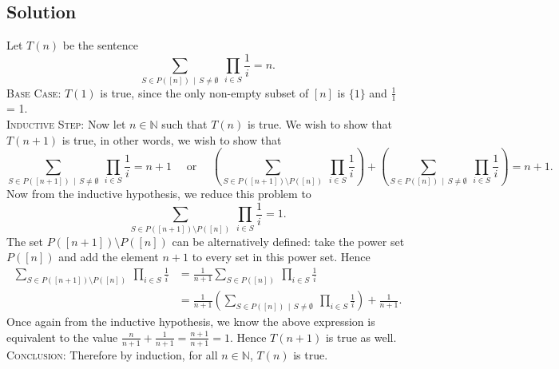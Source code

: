 \documentclass{article}
\begin{document}
\subsection*{Solution}
    Let $T(n)$ be the sentence $$\sum_{S \in P([n]) \, \mid \, S \ne \emptyset} \: \prod_{i \in S} \frac{1}{i} = n.$$ 
    \textsc{Base Case}:  $T(1)$ is true, since the only non-empty subset of $[n]$ is $\{1\}$ and $\frac{1}{1}$ = 1. \\
    \textsc{Inductive Step}: Now let $n \in \mathbb{N}$ such that $T(n)$ is true. We wish to show that $T(n + 1)$ is true, in other words, we wish to show that $$\sum_{S \in P([n + 1]) \, \mid \, S \ne \emptyset} \: \prod_{i \in S} \frac{1}{i} = n + 1 \quad\text{ or }\quad \left(\sum_{S \in P([n + 1]) \setminus P([n])} \: \prod_{i \in S} \frac{1}{i}\right) + \left(\sum_{S \in P([n]) \, \mid \, S \ne \emptyset} \: \prod_{i \in S} \frac{1}{i}\right) = n + 1.$$ Now from the inductive hypothesis, we reduce this problem to $$\sum_{S \in P([n + 1]) \setminus P([n])} \: \prod_{i \in S} \frac{1}{i} = 1.$$ The set $P([n + 1]) \setminus P([n])$ can be alternatively defined: take the power set $P([n])$ and add the element $n + 1$ to every set in this power set. Hence 
    \begin{align*}
        \sum_{S \in P([n + 1]) \setminus P([n])} \: \prod_{i \in S} \frac{1}{i} &= \frac{1}{n + 1}\sum_{S \in P([n])} \: \prod_{i \in S} \frac{1}{i} \\
        &= \frac{1}{n + 1}\left(\sum_{S \in P([n]) \, \mid \, S \ne \emptyset} \: \prod_{i \in S} \frac{1}{i}\right) + \frac{1}{n + 1}.
    \end{align*}
    Once again from the inductive hypothesis, we know the above expression is equivalent to the value $\frac{n}{n + 1} + \frac{1}{n + 1}= \frac{n + 1}{n + 1} = 1$. Hence $T(n + 1)$ is true as well. \\
    \textsc{Conclusion}: Therefore by induction, for all $n \in \mathbb{N}$, $T(n)$ is true.
\end{document}
